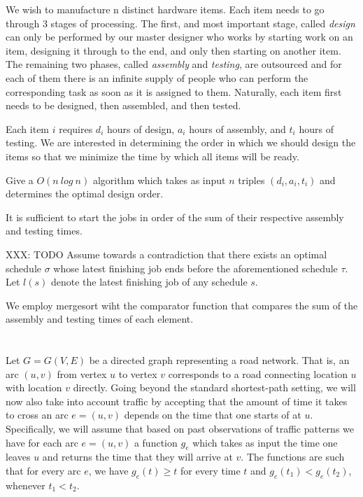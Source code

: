 \documentclass{amsart}
\theoremstyle{definition}
\theoremstyle{remark}
\numberwithin{equation}{section}
\begin{document}
We wish to manufacture n distinct hardware items. Each item needs to go
through 3 stages of processing. The first, and most important stage,
called \textit{design} can only be performed by our master designer who works
by starting work on an item, designing it through to the end, and only
then starting on another item. The remaining two phases, called \textit{assembly}
and \textit{testing}, are outsourced and for each of them there is an infinite
supply of people who can perform the corresponding task as soon as it is
assigned to them. Naturally, each item first needs to be designed, then
assembled, and then tested.

Each item $i$ requires $d_i$ hours of design, $a_i$ hours of assembly, and $t_i$
hours of testing. We are interested in determining the order in which we
should design the items so that we minimize the time by which all items
will be ready.

Give a $O(n\ log\ n)$ algorithm which takes as input $n$ triples
$(d_i,a_i,t_i)$ and determines the optimal design order.

\claimstar It is sufficient to start the jobs in order of the sum of
their respective assembly and testing times.

XXX: TODO
\proof Assume towards a contradiction that there exists an optimal
schedule $\sigma$ whose latest finishing job ends before the
aforementioned schedule $\tau$. Let $l (s)$ denote the latest
finishing job of any schedule $s$.

\alg We employ mergesort wiht the comparator function that compares
the sum of the assembly and testing times of each element.

\section{} Let $G = G(V, E)$ be a directed graph representing a
road network. That is, an arc $(u, v)$ from vertex $u$ to vertex
$v$ corresponds to a road connecting location $u$ with location $v$
directly. Going beyond the standard shortest-path setting, we will now
also take into account traffic by accepting that the amount of time it
takes to cross an arc $e = (u, v)$ depends on the time that one starts
of at $u$. Specifically, we will assume that based on past observations
of traffic patterns we have for each arc $e = (u, v)$ a function $g_e$
which takes as input the time one leaves $u$ and returns the time that
they will arrive at $v$. The functions are such that for every arc $e$,
we have $g_e(t) \geq t$ for every time $t$ and $g_e(t_1) < g_e(t_2)$,
whenever $t_1 < t_2$.
\end{document}
